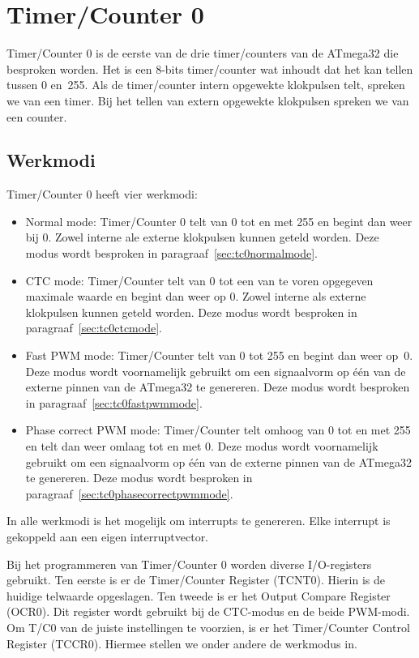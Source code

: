 \section{Timer/Counter 0}

Timer/Counter 0 is de eerste van de drie timer/counters van de ATmega32 die
besproken worden. Het is een 8-bits timer/counter wat inhoudt dat het kan tellen
tussen 0 en~255. Als de timer/counter intern opgewekte klokpulsen telt, spreken
we van een timer. Bij het tellen van extern opgewekte klokpulsen spreken
we van een counter.

\subsection{Werkmodi}

Timer/Counter 0 heeft vier werkmodi:

\begin{itemize}
\item Normal mode: Timer/Counter 0 telt van 0 tot en met 255 en begint dan
weer bij 0. Zowel interne ale externe klokpulsen kunnen geteld worden. Deze
modus wordt besproken in paragraaf~\ref{sec:tc0normalmode}.

\item CTC mode: Timer/Counter telt van 0 tot een van te voren opgegeven
maximale waarde en begint dan weer op 0. Zowel interne als externe klokpulsen
kunnen geteld worden. Deze modus wordt besproken in
paragraaf~\ref{sec:tc0ctcmode}.

\item Fast PWM mode: Timer/Counter telt van 0 tot 255 en begint dan weer op~0.
Deze modus wordt voornamelijk gebruikt om een signaalvorm op één van de externe
pinnen van de ATmega32 te genereren. Deze modus wordt besproken in
paragraaf~\ref{sec:tc0fastpwmmode}.

\item Phase correct PWM mode: Timer/Counter telt omhoog van 0 tot en met 255
en telt dan weer omlaag tot en met 0. Deze modus wordt voornamelijk gebruikt om een
signaalvorm op één van de externe pinnen van de ATmega32 te genereren.
Deze modus wordt besproken in paragraaf~\ref{sec:tc0phasecorrectpwmmode}.
\end{itemize}

In alle werkmodi is het mogelijk om interrupts te genereren. Elke interrupt
is gekoppeld aan een eigen interruptvector.

Bij het programmeren van Timer/Counter 0 worden diverse I/O-registers
gebruikt. Ten eerste is er de Timer/Counter Register (TCNT0). Hierin is de
huidige telwaarde opgeslagen. Ten tweede is er het Output Compare
Register (OCR0). Dit register wordt gebruikt bij de CTC-modus en de beide
PWM-modi. Om T/C0 van de juiste instellingen te voorzien, is er het
Timer/Counter Control Register (TCCR0). Hiermee stellen we onder andere de
werkmodus in.


